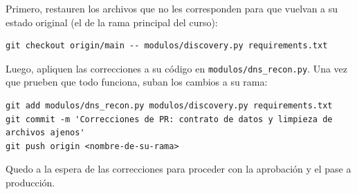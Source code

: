 \documentclass[12pt,a4paper]{article}
\begin{document}
Primero, restauren los archivos que no les corresponden para que vuelvan a su estado original (el de la rama principal del curso):
\begin{verbatim}
git checkout origin/main -- modulos/discovery.py requirements.txt
\end{verbatim}

Luego, apliquen las correcciones a su código en \texttt{modulos/dns\_recon.py}. Una vez que prueben que todo funciona, suban los cambios a su rama:
\begin{verbatim}
git add modulos/dns_recon.py modulos/discovery.py requirements.txt
git commit -m 'Correcciones de PR: contrato de datos y limpieza de archivos ajenos'
git push origin <nombre-de-su-rama>
\end{verbatim}

\vspace{1cm}
\noindent Quedo a la espera de las correcciones para proceder con la aprobación y el pase a producción.
\end{document}
